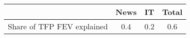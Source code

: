 \begin{small}
	\begin{tabular}{lccc}
	\hline
		& News & IT & Total \\
		\hline
		Share of TFP FEV explained & 0.4 & 0.2 & 0.6 \\
		\hline
	\end{tabular}
\end{small}
